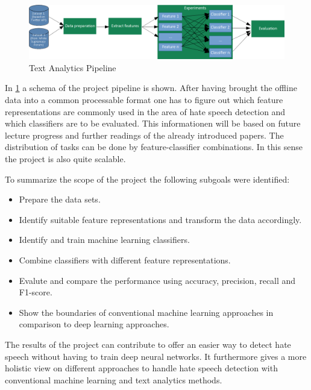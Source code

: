 \begin{figure}[H]
	\centering
	\includegraphics[width=1.0\textwidth]{./pipeline.png}	
	\caption{Text Analytics Pipeline}
	\label{fig:pipeline}
\end{figure}

In \ref{fig:pipeline} a schema of the project pipeline is shown. After having brought the offline data into a common processable format one has to figure out which feature representations are commonly used in the area of hate speech detection and which classifiers are to be evaluated. This informationen will be based on future lecture progress and further readings of the already introduced papers. The distribution of tasks can be done by feature-classifier combinations. In this sense the project is also quite scalable.  

\vspace{12pt}
To summarize the scope of the project the following subgoals were iden\-ti\-fied:

\begin{itemize}
	\item Prepare the data sets.
	\item Identify suitable feature representations and transform the data ac\-cord\-ingly.
	\item Identify and train machine learning classifiers.
	\item Combine classifiers with different feature representations.
	\item Evalute and compare the performance using accuracy, precision, recall and F1-score.
	\item Show the boundaries of conventional machine learning approaches in comparison to deep learning approaches.
\end{itemize}

The results of the project can contribute to offer an easier way to detect hate speech without having to train deep neural networks. It furthermore gives a more holistic view on different approaches to handle hate speech detection with conventional machine learning and text analytics methods.
